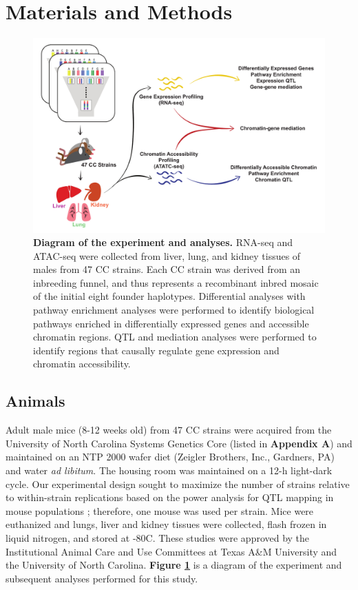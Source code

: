 \documentclass[9pt,twocolumn,twoside]{gsajnl}
\begin{document}
\section{Materials and Methods}
\label{sec:materials:methods}

\begin{figure}[htbp]
\renewcommand{\familydefault}{\sfdefault}\normalfont
\centering
\includegraphics[width=0.8\linewidth, clip, trim={0in 0.1in 0in 0.2in}]{figs/overview_diagram_simplified.pdf}
\caption{\textbf{Diagram of the experiment and analyses.} RNA-seq and ATAC-seq were collected from liver, lung, and kidney tissues of males from 47 CC strains. Each CC strain was derived from an inbreeding funnel, and thus represents a recombinant inbred mosaic of the initial eight founder haplotypes. Differential analyses with pathway enrichment analyses were performed to identify biological pathways enriched in differentially expressed genes and accessible chromatin regions. QTL and mediation analyses were performed to identify regions that causally regulate gene expression and chromatin accessibility.
\label{fig:overview}}
\end{figure}

\subsection{Animals}

Adult male mice (8-12 weeks old) from 47 CC strains were acquired from the University of North Carolina Systems Genetics Core (listed in \textbf{Appendix A}) and maintained on an NTP 2000 wafer diet (Zeigler Brothers, Inc., Gardners, PA) and water \textit{ad libitum}. The housing room was maintained on a 12-h light-dark cycle. Our experimental design sought to maximize the number of strains relative to within-strain replications based on the power analysis for QTL mapping in mouse populations \citep{Kaeppler1997}; therefore, one mouse was used per strain. Mice were euthanized and lungs, liver and kidney tissues were collected, flash frozen in liquid nitrogen, and stored at -80\degree C. These studies were approved by the Institutional Animal Care and Use Committees at Texas A\&M University and the University of North Carolina. \textbf{Figure \ref{fig:overview}} is a diagram of the experiment and subsequent analyses performed for this study.
\end{document}
